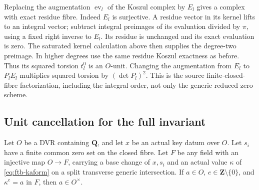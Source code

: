 Replacing the augmentation \(\operatorname{ev}_l\) of the Koszul
complex by \(E_l\) gives a complex with exact residue fibre.
Indeed \(E_l\) is surjective.  A residue vector in its kernel lifts
to an integral vector; subtract integral preimages of its evaluation
divided by \(\pi\), using a fixed right inverse to \(E_l\).
Its residue is unchanged and its exact evaluation is zero.
The saturated kernel calculation above then supplies the
degree-two preimage.  In higher degrees use the same residue
Koszul exactness as before.  Thus its squared torsion \(t_l^0\)
is an \(O\)-unit.  Changing the augmentation from \(E_l\) to
\(P_lE_l\) multiplies squared torsion by \((\det P_l)^2\).
This is the source finite-closed-fibre factorization, including
the integral order, not only the generic reduced zero scheme.

\subsection{Unit cancellation for the full invariant}
\begin{srproposition}
\label{prop:ftb-key-finite-zeros-unit}
Let \(O\) be a DVR containing \(\mathbf Q\), and let \(x\) be an
actual key datum over \(O\).  Let \(s_i\) have a finite common
zero set on the closed fibre.  Let \(F\) be any field with an
injective map \(O\to F\), carrying a base change of \(x,s_i\)
and an actual value \(\kappa\) of
\eqref{eq:ftb-kaform} on a split transverse generic intersection.
If \(a\in O\), \(e\in\mathbf Z\setminus\{0\}\), and
\(\kappa^e=a\) in \(F\), then \(a\in O^\times\).
\end{srproposition}

